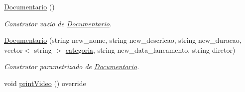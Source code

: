 \begin{DoxyCompactItemize}
\item 
\hyperlink{classDocumentario_a2a3230879c151f742ebaa5645d86f284}{Documentario} ()\hypertarget{classDocumentario_a2a3230879c151f742ebaa5645d86f284}{}\label{classDocumentario_a2a3230879c151f742ebaa5645d86f284}

\begin{DoxyCompactList}\small\item\em Construtor vazio de \hyperlink{classDocumentario}{Documentario}. \end{DoxyCompactList}\item 
\hyperlink{classDocumentario_af1e9237063a8f47cab171b83ebd17e68}{Documentario} (string new\+\_\+nome, string new\+\_\+descricao, string new\+\_\+duracao, vector$<$ string $>$ \hyperlink{classVideo_a8ff58ab1ddf14d474ea7174b13ed05b4}{categoria}, string new\+\_\+data\+\_\+lancamento, string diretor)\hypertarget{classDocumentario_af1e9237063a8f47cab171b83ebd17e68}{}\label{classDocumentario_af1e9237063a8f47cab171b83ebd17e68}

\begin{DoxyCompactList}\small\item\em Construtor parametrizado de \hyperlink{classDocumentario}{Documentario}. \end{DoxyCompactList}\item 
void \hyperlink{classDocumentario_abe00fa763c2761ed79f80fb7b2a99de0}{print\+Video} () override\hypertarget{classDocumentario_abe00fa763c2761ed79f80fb7b2a99de0}{}\label{classDocumentario_abe00fa763c2761ed79f80fb7b2a99de0}


\end{DoxyCompactItemize}

